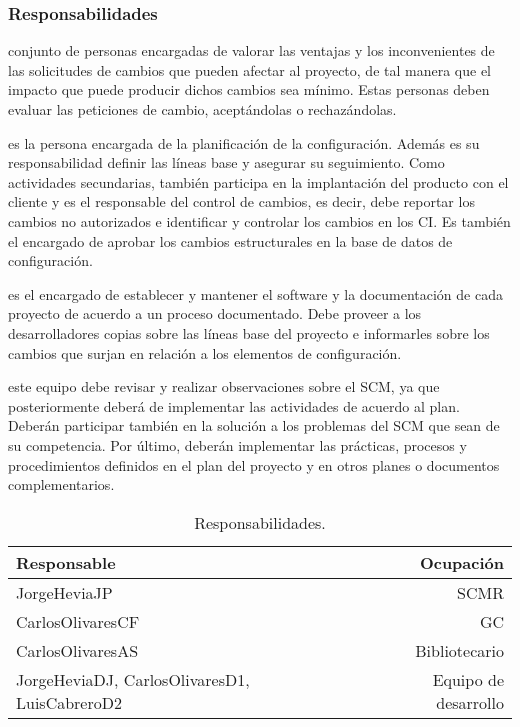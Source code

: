 \subsubsection{Responsabilidades}
\begin{description}[style=multiline, leftmargin=4cm]
  \item[Comité de control de cambios:] conjunto de personas encargadas de valorar las ventajas y los inconvenientes de las solicitudes de cambios que pueden afectar al proyecto, de tal manera que el impacto que puede producir dichos cambios sea mínimo.  Estas personas deben evaluar las peticiones de cambio, aceptándolas o rechazándolas.
  \item[Responsable de GC:] es la persona encargada de la planificación de la configuración. Además es su responsabilidad definir las líneas base y asegurar su seguimiento. Como actividades secundarias, también participa en la implantación del producto con el cliente y es el responsable del control de cambios, es decir, debe reportar los cambios no autorizados e identificar y controlar los cambios en los CI. Es también el encargado de aprobar los cambios estructurales en la base de datos de configuración.
  \item[Bibliotecario:] es el encargado de establecer y mantener el software y la documentación de cada proyecto de acuerdo a un proceso documentado. Debe proveer a los desarrolladores copias sobre las líneas base del proyecto e informarles sobre los cambios que surjan en relación a los elementos de configuración.
  \item[Resto personal desarrollador:] este equipo debe revisar y realizar observaciones sobre el SCM, ya que posteriormente deberá de implementar las actividades de acuerdo al plan. Deberán participar también en la solución a los problemas del SCM que sean de su competencia. Por último, deberán implementar las prácticas, procesos y procedimientos definidos en el plan del proyecto y en otros planes o documentos complementarios.
\end{description}

\begin{table}[h]
\begin{center}
\begin{tabular}{ p{5cm} | r }
\hline
	\textbf{Responsable} & \textbf{Ocupación} \\ \hline \hline
  JorgeHeviaJP & SCMR \\
  CarlosOlivaresCF & GC \\
  CarlosOlivaresAS & Bibliotecario \\
  JorgeHeviaDJ, CarlosOlivaresD1, LuisCabreroD2 & Equipo de desarrollo \\ \hline
\end{tabular}
\caption{Responsabilidades.}
\label{tab:Responsabilidades}
\end{center}
\end{table}


